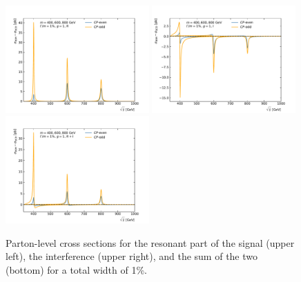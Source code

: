 \begin{figure}
  \centering
  \includegraphics[width=0.49\textwidth]{fig/chapt4/gen_plots/analytical/xSec_relW1_R}
  \includegraphics[width=0.49\textwidth]{fig/chapt4/gen_plots/analytical/xSec_relW1_I} \\
  \includegraphics[width=0.49\textwidth]{fig/chapt4/gen_plots/analytical/xSec_relW1_Sum}
  \caption{Parton-level cross sections for the resonant part of the signal (upper left), the interference (upper right), and the sum of the two (bottom) for a total width of 1\%.}
  \label{Fig:AnalyticXSec_relW1}
\end{figure}

